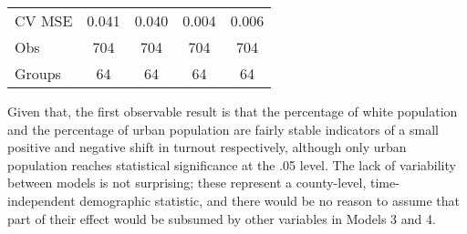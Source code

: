 \documentclass[]{article}
\begin{document}
\begin{longtable}[]{@{}lcccc@{}}
\begin{minipage}[t]{0.26\columnwidth}
CV MSE\strut
\end{minipage} & \begin{minipage}[t]{0.12\columnwidth}\centering\strut
0.041\strut
\end{minipage} & \begin{minipage}[t]{0.13\columnwidth}\centering\strut
0.040\strut
\end{minipage} & \begin{minipage}[t]{0.14\columnwidth}\centering\strut
0.004\strut
\end{minipage} & \begin{minipage}[t]{0.14\columnwidth}\centering\strut
0.006\strut
\end{minipage}\tabularnewline
\begin{minipage}[t]{0.26\columnwidth}\raggedright\strut
Obs\strut
\end{minipage} & \begin{minipage}[t]{0.12\columnwidth}\centering\strut
704\strut
\end{minipage} & \begin{minipage}[t]{0.13\columnwidth}\centering\strut
704\strut
\end{minipage} & \begin{minipage}[t]{0.14\columnwidth}\centering\strut
704\strut
\end{minipage} & \begin{minipage}[t]{0.14\columnwidth}\centering\strut
704\strut
\end{minipage}\tabularnewline
\begin{minipage}[t]{0.26\columnwidth}\raggedright\strut
Groups\strut
\end{minipage} & \begin{minipage}[t]{0.12\columnwidth}\centering\strut
64\strut
\end{minipage} & \begin{minipage}[t]{0.13\columnwidth}\centering\strut
64\strut
\end{minipage} & \begin{minipage}[t]{0.14\columnwidth}\centering\strut
64\strut
\end{minipage} & \begin{minipage}[t]{0.14\columnwidth}\centering\strut
64\strut
\end{minipage}\tabularnewline
\bottomrule
\end{longtable}

Given that, the first observable result is that the percentage of white
population and the percentage of urban population are fairly stable
indicators of a small positive and negative shift in turnout
respectively, although only urban population reaches statistical
significance at the .05 level. The lack of variability between models is
not surprising; these represent a county-level, time-independent
demographic statistic, and there would be no reason to assume that part
of their effect would be subsumed by other variables in Models 3 and 4.
\end{document}
